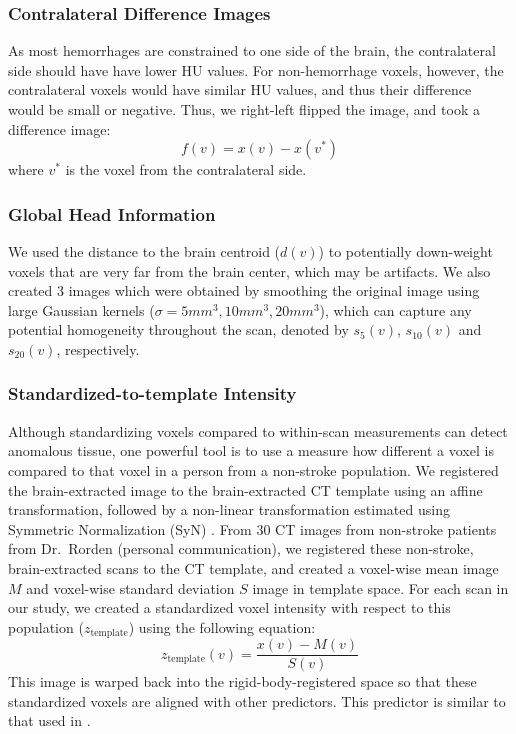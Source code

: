 \documentclass{elsarticle_nonatbib}\usepackage[]{graphicx}\usepackage[]{color}
\begin{document}
\subsubsection{Contralateral Difference Images}  As most hemorrhages are constrained to one side of the brain, the contralateral side should have have lower HU values.  For non-hemorrhage voxels, however, the contralateral voxels would have similar HU values, and thus their difference would be small or negative.  Thus, we right-left flipped the image, and took a difference image: 
\begin{equation}
f(v) = x(v) - x(v^{*}) \label{eq:flip}
\end{equation}
where $v^{*}$ is the voxel from the contralateral side.  



\subsubsection{Global Head Information} We used the distance to the brain centroid ($d(v)$) to potentially down-weight voxels that are very far from the brain center, which may be artifacts.    We also created $3$ images which were obtained by smoothing the original image using large Gaussian kernels ($\sigma = 5mm^3, 10mm^3, 20mm^3$), which can capture any potential homogeneity throughout the scan, denoted by $s_{5}(v)$, $s_{10}(v)$ and $s_{20}(v)$, respectively.   

\subsubsection{Standardized-to-template Intensity}  
Although standardizing voxels compared to within-scan measurements can detect anomalous tissue, one powerful tool is to use a measure how different a voxel is compared to that voxel in a person from a non-stroke population.  We registered the brain-extracted image to the brain-extracted CT template using an affine transformation, followed by a non-linear transformation estimated using Symmetric Normalization (SyN) \citep{avants_symmetric_2008}.  
From $30$ CT images from non-stroke patients from Dr.~Rorden (personal communication), we registered these non-stroke, brain-extracted scans to the CT template, and created a voxel-wise mean image $M$ and voxel-wise standard deviation $S$ image in template space.  For each scan in our study, we created a standardized voxel intensity with respect to this population ($z_{\text{template}}$) using the following equation:
$$
z_{\text{template}}(v) = \frac{x(v) - M(v)}{S(v)}
$$
This image is warped back into the rigid-body-registered space so that these standardized voxels are aligned with other predictors.  This predictor is similar to that used in \citet{gillebert_automated_2014}.  
\end{document}
